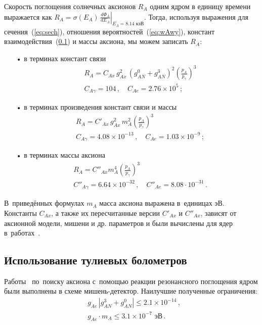 \documentclass[a4paper,article,14pt]{extarticle}
\begin{document}
Скорость поглощения солнечных аксионов $R_A$ одним ядром {\Tm} в единицу времени выражается как $R_A = \sigma(E_A)\,\left.\frac{d\Phi_A}{dE_A} \right|_{E_A = 8.14 \text{\ кэВ}}$.
Тогда, используя выражения для сечения~(\ref{eq:sech}), отношения вероятностей~(\ref{eq:wAwy}), констант взаимодействия~(\ref{}) и массы аксиона, мы можем записать $R_A$:
\begin{itemize}
    \item[•] в терминах констант связи
          \begin{align}\label{RAg1}
               & R_A =
              C_{Ax}\, g_{Ax}^2\,(g_{AN}^0 + g_{AN}^3)^2
              \left(\frac{p_A}{p_\gamma}\right)^3 \\
               & C_{A\gamma } = 104\, ,\quad
              C_{Ae} = 2.76 \times {10^5}\, ;\nonumber
          \end{align}
    \item[•] в терминах произведения констант связи и массы
          \begin{align}\label{RAg}
               & {R_A} =
              C'_{Ax}\, g_{Ax}^2\, m_A^2
              \left(\frac{p_A}{p_\gamma}\right)^3             \\
               & C_{A\gamma } = 4.08 \times 10^{-13}\, ,\quad
              C_{Ae} = 1.03 \times {10^{-9}}\, ;\nonumber
          \end{align}
    \item[•] в терминах массы аксиона
          \begin{align}\label{RAm}
               & R_A =
              C''_{Ax} m_A^4
              \left(\frac{p_A}{p_\gamma}\right)^3               \\
               & C''_{A\gamma } = 6.64 \times 10^{-32}\, ,\quad
              C''_{Ae} = 8.08 \cdot 10^{-31}\, .\nonumber
          \end{align}
\end{itemize}
В~приведённых формулах $m_A$ масса аксиона выражена в~единицах эВ.
Константы $C_{Ax}$, а также их пересчитанные версии $C'_{Ax }$ и $C''_{Ax }$, зависят от аксионной модели, мишени и др. параметров и были вычислены для ядер {\Tm} в~работах~\cite{Derbin2009,redondo2013solar}.

\subsection{Использование тулиевых  болометров}
Работы~\cite{Derbin2007,Derbin2009,derbin2011constraints} по~поиску аксиона с~помощью реакции резонансного поглощения ядром {\Tm} были выполнены в схеме мишень-детектор. Наилучшие полученные ограничения:
\begin{align}
     & g_{Ae}\,\left| g_{AN}^3 + g_{AN}^0 \right| \leqslant
    2.1 \times 10^{-14}\, ,                                 \\
     & g_{Ae} \cdot {m_A} \leqslant
    3.1 \times 10^{-7} \text{ эВ}\, .
\end{align}
\end{document}
